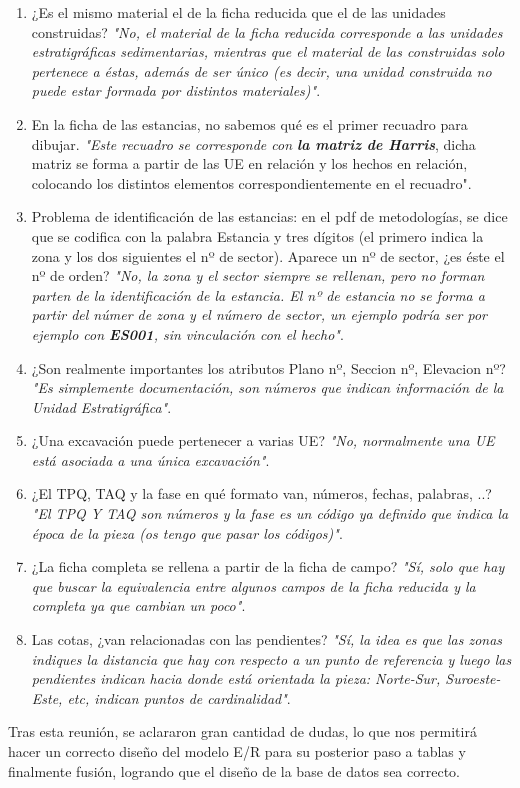     \begin{enumerate}
        \item ¿Es el mismo material el de la ficha reducida que el de las unidades
        construidas? \textit{"No, el material de la ficha reducida corresponde a las
        unidades estratigráficas sedimentarias, mientras que el material de las
        construidas solo pertenece a éstas, además de ser único (es decir, una unidad
        construida no puede estar formada por distintos materiales)"}.
        \item En la ficha de las estancias, no sabemos qué es el primer recuadro para
        dibujar. \textit{"Este recuadro se corresponde con \textbf{la matriz de Harris}},
        dicha matriz se forma a partir de las UE en relación y los hechos en relación,
        colocando los distintos elementos correspondientemente en el recuadro".
        \item Problema de identificación de las estancias: en el pdf de metodologías, 
        se dice que se codifica con la palabra Estancia y tres dígitos (el primero
        indica la zona y los dos siguientes el nº de sector). Aparece un nº de sector,
        ¿es éste el nº de orden? \textit{"No, la zona y el sector siempre se rellenan,
        pero no forman parten de la identificación de la estancia. El nº de estancia
        no se forma a partir del númer de zona y el número de sector, un ejemplo podría
        ser por ejemplo con \textbf{ES001}, sin vinculación con el hecho"}.
        \item ¿Son realmente importantes los atributos Plano nº, Seccion nº, Elevacion
        nº? \textit{"Es simplemente documentación, son números que indican información
        de la Unidad Estratigráfica"}.
        \item ¿Una excavación puede pertenecer a varias UE? \textit{"No, normalmente una
        UE está asociada a una única excavación"}.
        \item ¿El TPQ, TAQ y la fase en qué formato van, números, fechas, palabras, ..?
        \textit{"El TPQ Y TAQ son números y la fase es un código ya definido que indica
        la época de la pieza (os tengo que pasar los códigos)"}.
        \item ¿La ficha completa se rellena a partir de la ficha de campo? \textit{"Sí,
        solo que hay que buscar la equivalencia entre algunos campos de la ficha
        reducida y la completa ya que cambian un poco"}.
        \item Las cotas, ¿van relacionadas con las pendientes? \textit{"Sí, la idea es
        que las zonas indiques la distancia que hay con respecto a un punto de referencia
        y luego las pendientes indican hacia donde está orientada la pieza: Norte-Sur,
        Suroeste-Este, etc, indican puntos de cardinalidad"}.
    \end{enumerate}

Tras esta reunión, se aclararon gran cantidad de dudas, lo que nos permitirá hacer un
correcto diseño del modelo E/R para su posterior paso a tablas y finalmente fusión, logrando
que el diseño de la base de datos sea correcto.
